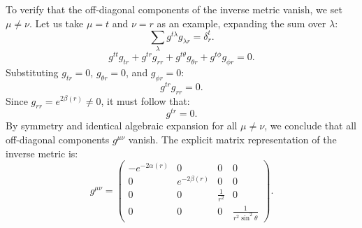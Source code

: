 \documentclass[11pt, a4paper]{report}
\begin{document}
To verify that the off-diagonal components of the inverse metric vanish, we set $\mu \neq \nu$. Let us take $\mu = t$ and $\nu = r$ as an example, expanding the sum over $\lambda$:
\begin{equation}
\sum_{\lambda} g^{t\lambda} g_{\lambda r} = \delta^t_r.
\end{equation}
\begin{equation}
g^{tt} g_{tr} + g^{tr} g_{rr} + g^{t\theta} g_{\theta r} + g^{t\phi} g_{\phi r} = 0.
\end{equation}
Substituting $g_{tr} = 0$, $g_{\theta r} = 0$, and $g_{\phi r} = 0$:
\begin{equation}
g^{tr} g_{rr} = 0.
\end{equation}
Since $g_{rr} = e^{2\beta(r)} \neq 0$, it must follow that:
\begin{equation}
g^{tr} = 0.
\end{equation}
By symmetry and identical algebraic expansion for all $\mu \neq \nu$, we conclude that all off-diagonal components $g^{\mu\nu}$ vanish. The explicit matrix representation of the inverse metric is:
\begin{equation}
g^{\mu\nu} = \begin{pmatrix}
-e^{-2\alpha(r)} & 0 & 0 & 0 \\
0 & e^{-2\beta(r)} & 0 & 0 \\
0 & 0 & \frac{1}{r^2} & 0 \\
0 & 0 & 0 & \frac{1}{r^2 \sin^2\theta}
\end{pmatrix}.
\end{equation}
\end{document}
